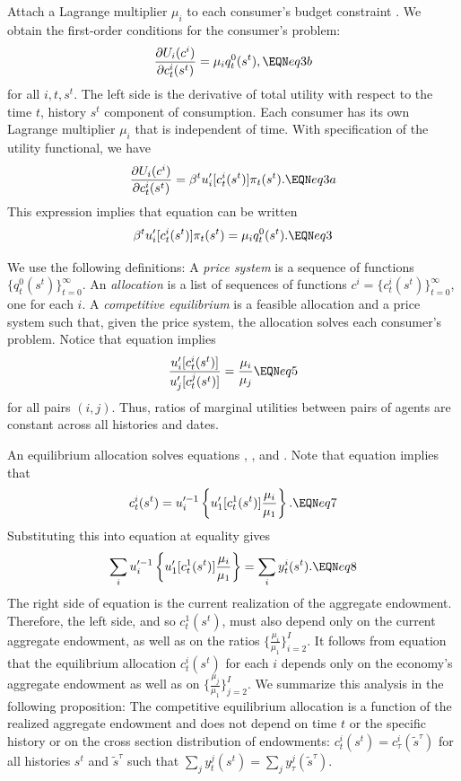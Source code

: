 Attach a Lagrange multiplier $\mu_i$ to each consumer's  budget constraint  .
We obtain the
first-order conditions for the consumer's problem:
$$  {\partial U_i(c^i) \over \partial c_t^i(s^t)} = \mu_i q_t^0(s^t), \EQN eq3b $$
for all $i, t, s^t$.
The left side is the derivative of total utility with respect to
the time $t$, history $s^t$ component of consumption.  Each
consumer has its own Lagrange multiplier $\mu_i$ that is independent of time. With specification  of the utility functional,
we have
$$ {\partial U_i(c^i) \over \partial c_t^i(s^t)} =   \beta^t
 u'_i[c_t^i(s^t)] \pi_t(s^t) .  \EQN eq3a $$
This expression  implies that equation  can be written
$$ \beta^t u'_i[c_t^i(s^t)] \pi_t(s^t) = \mu_i q_t^0(s^t). \EQN eq3 $$


We use the following  definitions:
\medskip
{}   A {\it price system} is a sequence of
functions $\{q_t^0(s^t)\}_{t=0}^\infty$.  An {\it allocation} is
a list of sequences of functions $c^i=\{c_t^i(s^t)\}_{t=0}^\infty$,
 one for each $i$.
\medskip
{} A {\it competitive equilibrium} is
a feasible allocation and a price system such that, given
the price system,  the allocation solves
each consumer's problem.
\medskip
Notice that equation  implies
$$ {u'_i[c_t^i(s^t)] \over
 u'_j[c_t^j(s^t)] }
 = {\mu_i\over \mu_j}          \EQN eq5 $$
for all pairs $(i,j)$.
Thus, ratios of marginal utilities between pairs of agents are
constant across all histories and dates.


An equilibrium allocation solves equations  ,  ,
and . Note that equation  implies that
$$ c_t^i(s^t) = u^{\prime -1}_i  \left\{u'_1[c_t^1(s^t)] {\mu_i \over \mu_1}
 \right\}. \EQN eq7 $$
Substituting this into equation  at equality gives
$$ \sum_i
u^{\prime -1}_i  \left\{u'_1[c_t^1(s^t)] {\mu_i \over \mu_1}\right\} =
       \sum_i y_t^i(s^t) .  \EQN eq8 $$
The right side of equation  is the current realization of
the aggregate endowment. %
Therefore, the left
side, and  so $c_t^1(s^t)$,  must also depend only on the current
aggregate endowment, as well as on the ratios
$\{ {\frac{\mu_i}{\mu_1}} \}_{i=2}^I$.  It follows from equation  that the
equilibrium allocation $c_t^i(s^t)$ for each $i$ depends only on
the economy's aggregate endowment as well as on
$\{ {\frac{\mu_j}{\mu_1}} \}_{j=2}^I$. We summarize this analysis  in
the following proposition:
\medskip
{}  The competitive equilibrium allocation
is a function of the realized aggregate endowment and does not depend
on time $t$ or the specific history or on
the cross section distribution of endowments:
$c_t^i(s^t)=c_\tau^i(\tilde s^{\tau})$ for all histories $s^t$ and $\tilde
s^{\tau}$ such that $\sum_j y_t^j(s^t) = \sum_j y_\tau^j(\tilde
s^{\tau})$.


